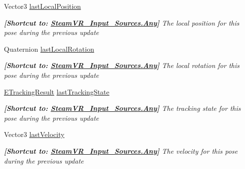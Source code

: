 \begin{DoxyCompactItemize}
Vector3 \mbox{\hyperlink{class_valve_1_1_v_r_1_1_steam_v_r___action___pose___base_ad202da8c9e48c17edb7a9619e51d9628}{last\+Local\+Position}}
\begin{DoxyCompactList}\small\item\em {\bfseries{\mbox{[}Shortcut to\+: \mbox{\hyperlink{namespace_valve_1_1_v_r_a82e5bf501cc3aa155444ee3f0662853faed36a1ef76a59ee3f15180e0441188ad}{Steam\+V\+R\+\_\+\+Input\+\_\+\+Sources.\+Any}}\mbox{]}}} The local position for this pose during the previous update \end{DoxyCompactList}\item 
Quaternion \mbox{\hyperlink{class_valve_1_1_v_r_1_1_steam_v_r___action___pose___base_ae33de6962f9cf4dd2e217f87f21c00db}{last\+Local\+Rotation}}
\begin{DoxyCompactList}\small\item\em {\bfseries{\mbox{[}Shortcut to\+: \mbox{\hyperlink{namespace_valve_1_1_v_r_a82e5bf501cc3aa155444ee3f0662853faed36a1ef76a59ee3f15180e0441188ad}{Steam\+V\+R\+\_\+\+Input\+\_\+\+Sources.\+Any}}\mbox{]}}} The local rotation for this pose during the previous update \end{DoxyCompactList}\item 
\mbox{\hyperlink{namespace_valve_1_1_v_r_abe6feab98f33191b7c27b4292012e90a}{E\+Tracking\+Result}} \mbox{\hyperlink{class_valve_1_1_v_r_1_1_steam_v_r___action___pose___base_a6457af1bdc6f13c61d2171c320d660cb}{last\+Tracking\+State}}
\begin{DoxyCompactList}\small\item\em {\bfseries{\mbox{[}Shortcut to\+: \mbox{\hyperlink{namespace_valve_1_1_v_r_a82e5bf501cc3aa155444ee3f0662853faed36a1ef76a59ee3f15180e0441188ad}{Steam\+V\+R\+\_\+\+Input\+\_\+\+Sources.\+Any}}\mbox{]}}} The tracking state for this pose during the previous update \end{DoxyCompactList}\item 
Vector3 \mbox{\hyperlink{class_valve_1_1_v_r_1_1_steam_v_r___action___pose___base_a46d9cbd329e828e28127f7af2d470e8c}{last\+Velocity}}
\begin{DoxyCompactList}\small\item\em {\bfseries{\mbox{[}Shortcut to\+: \mbox{\hyperlink{namespace_valve_1_1_v_r_a82e5bf501cc3aa155444ee3f0662853faed36a1ef76a59ee3f15180e0441188ad}{Steam\+V\+R\+\_\+\+Input\+\_\+\+Sources.\+Any}}\mbox{]}}} The velocity for this pose during the previous update \end{DoxyCompactList}\item 

\end{DoxyCompactItemize}
